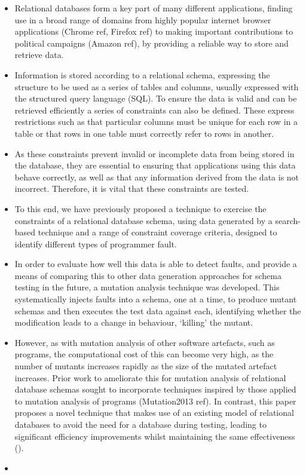\begin{itemize}

  \item Relational databases form a key part of many different applications, finding use in a broad range of domains from highly popular internet browser applications (Chrome ref, Firefox ref) to making important contributions to political campaigns (Amazon ref), by providing a reliable way to store and retrieve data.

  \item Information is stored according to a relational schema, expressing the structure to be used as a series of tables and columns, usually expressed with the structured query language (SQL). To ensure the data is valid and can be retrieved efficiently a series of constraints can also be defined. These express restrictions such as that particular columns must be unique for each row in a table or that rows in one table must correctly refer to rows in another.

  \item As these constraints prevent invalid or incomplete data from being stored in the database, they are essential to ensuring that applications using this data behave correctly, as well as that any information derived from the data is not incorrect. Therefore, it is vital that these constraints are tested.

  \item To this end, we have previously proposed a technique to exercise the constraints of a relational database schema, using data generated by a search-based technique and a range of constraint coverage criteria, designed to identify different types of programmer fault.

  \item In order to evaluate how well this data is able to detect faults, and provide a means of comparing this to other data generation approaches for schema testing in the future, a mutation analysis technique was developed. This systematically injects faults into a schema, one at a time, to produce mutant schemas and then executes the test data against each, identifying whether the modification leads to a change in behaviour, `killing' the mutant.

  \item However, as with mutation analysis of other software artefacts, such as programs, the computational cost of this can become very high, as the number of mutants increases rapidly as the size of the mutated artefact increases. Prior work to ameliorate this for mutation analysis of relational database schemas sought to incorporate techniques inspired by those applied to mutation analysis of programs (Mutation2013 ref). In contrast, this paper proposes a novel technique that makes use of an existing model of relational databases to avoid the need for a database during testing, leading to significant efficiency improvements whilst maintaining the same effectiveness ().

  \item {}

\end{itemize}
